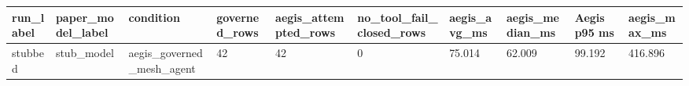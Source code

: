\begin{tabular}{llllllllll}
 \hline
run\_label & paper\_model\_label & condition & governed\_rows & aegis\_attempted\_rows & no\_tool\_fail\_closed\_rows & aegis\_avg\_ms & aegis\_median\_ms & Aegis p95 ms & aegis\_max\_ms \\
 \hline
stubbed & stub\_model & aegis\_governed\_mesh\_agent & 42 & 42 & 0 & 75.014 & 62.009 & 99.192 & 416.896 \\
 \hline
\end{tabular}
